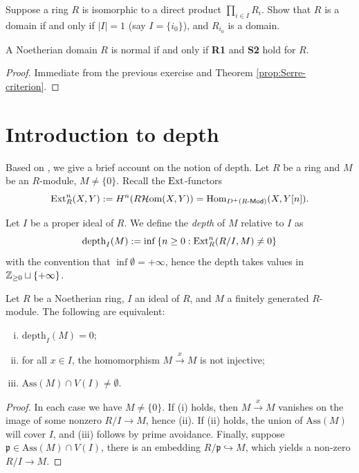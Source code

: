 \begin{exercise}
	Suppose a ring $R$ is isomorphic to a direct product $\prod_{i \in I} R_i$. Show that $R$ is a domain if and only if $|I|=1$ (say $I=\{i_0\}$), and $R_{i_0}$ is a domain.
\end{exercise}

\begin{corollary}
	A Noetherian domain $R$ is normal if and only if \textbf{R1} and \textbf{S2} hold for $R$.
\end{corollary}
\begin{proof}
	Immediate from the previous exercise and Theorem \ref{prop:Serre-criterion}.
\end{proof}

\section{Introduction to depth}
Based on \cite{Bour98}, we give a brief account on the notion of depth. Let $R$ be a ring and $M$ be an $R$-module, $M \neq \{0\}$. Recall the $\operatorname{Ext}$-functors
\[ \operatorname{Ext}^n_R(X,Y) := H^n(R\mathcal{H}\text{om}(X,Y)) = \text{Hom}_{D^+(R\text{-}\mathsf{Mod})}(X, Y[n]). \]

\begin{definition}
	Let $I$ be a proper ideal of $R$. We define the \emph{depth} of $M$ relative to $I$ as
	\[ \text{depth}_I(M) := \inf \left\{n \geq 0: \operatorname{Ext}^n_R(R/I, M) \neq 0 \right\}\]
	with the convention that $\inf\emptyset = +\infty$, hence the depth takes values in $\mathbb{Z}_{\geq 0} \sqcup \{+\infty\}$.
\end{definition}

\begin{proposition}\label{prop:depth-zero}
	Let $R$ be a Noetherian ring, $I$ an ideal of $R$, and $M$ a finitely generated $R$-module. The following are equivalent:
	\begin{enumerate}[(i)]
		\item $\mathrm{depth}_I(M)=0$;
		\item for all $x \in I$, the homomorphism $M \xrightarrow{x} M$ is not injective;
		\item $\text{Ass}(M) \cap V(I) \neq \emptyset$.
	\end{enumerate}
\end{proposition}
\begin{proof}
	In each case we have $M \neq \{0\}$. If (i) holds, then $M \xrightarrow{x} M$ vanishes on the image of some nonzero $R/I \to M$, hence (ii). If (ii) holds, the union of $\text{Ass}(M)$ will cover $I$, and (iii) follows by prime avoidance. Finally, suppose $\mathfrak{p} \in \text{Ass}(M) \cap V(I)$, there is an embedding $R/\mathfrak{p} \hookrightarrow M$, which yields a non-zero $R/I \to M$.
\end{proof}

